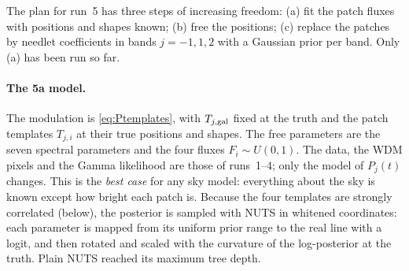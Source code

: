 \documentclass[11pt,a4paper]{article}
\begin{document}
The plan for run~5 has three steps of increasing freedom: (a) fit the patch fluxes
with positions and shapes known; (b) free the positions; (c) replace the patches by
needlet coefficients in bands $j=-1,1,2$ with a Gaussian prior per band. Only (a) has
been run so far.

\paragraph{The 5a model.} The modulation is \cref{eq:Ptemplates}, with
$T_{j,{\rm gal}}$ fixed at the truth and the patch templates $T_{j,i}$ at their true
positions and shapes. The free parameters are the seven spectral parameters and the
four fluxes $F_i\sim U(0,1)$. The data, the WDM pixels and the Gamma likelihood are
those of runs~1--4; only the model of $P_j(t)$ changes. This is the \emph{best case}
for any sky model: everything about the sky is known except how bright each patch is.
Because the four templates are strongly correlated (below), the posterior is sampled
with NUTS in whitened coordinates: each parameter is mapped from its uniform prior
range to the real line with a logit, and then rotated and scaled with the curvature
of the log-posterior at the truth. Plain NUTS reached its maximum tree depth.
\end{document}
